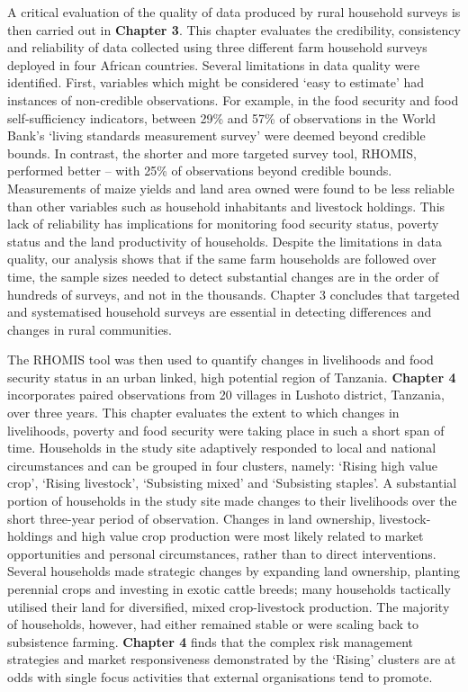 A critical evaluation of the quality of data produced by rural household surveys is then carried out in \textbf{Chapter 3}. This chapter evaluates the credibility, consistency and reliability of data collected using three different farm household surveys deployed in four African countries. Several limitations in data quality were identified. First, variables which might be considered `easy to estimate' had instances of non-credible observations. For example, in the food security and food self-sufficiency indicators, between 29\% and 57\% of observations in the World Bank's `living standards measurement survey' were deemed beyond credible bounds. In contrast, the shorter and more targeted survey tool, RHOMIS, performed better -- with 25\% of observations beyond credible bounds. Measurements of maize yields and land area owned were found to be less reliable than other variables such as household inhabitants and livestock holdings. This lack of reliability has implications for monitoring food security status, poverty status and the land productivity of households. Despite the limitations in data quality, our analysis shows that if the same farm households are followed over time, the sample sizes needed to detect substantial changes are in the order of hundreds of surveys, and not in the thousands. Chapter 3 concludes that targeted and systematised household surveys are essential in detecting differences and changes in rural communities.

The RHOMIS tool was then used to quantify changes in livelihoods and food security status in an urban linked, high potential region of Tanzania. \textbf{Chapter 4} incorporates paired observations from 20 villages in Lushoto district, Tanzania, over three years. This chapter evaluates the extent to which changes in livelihoods, poverty and food security were taking place in such a short span of time. Households in the study site adaptively responded to local and national circumstances and can be grouped in four clusters, namely: `Rising high value crop', `Rising livestock', `Subsisting mixed' and `Subsisting staples'. A substantial portion of households in the study site made changes to their livelihoods over the short three-year period of observation. Changes in land ownership, livestock-holdings and high value crop production were most likely related to market opportunities and personal circumstances, rather than to direct interventions. Several households made strategic changes by expanding land ownership, planting perennial crops and investing in exotic cattle breeds; many households tactically utilised their land for diversified, mixed crop-livestock production. The majority of households, however, had either remained stable or were scaling back to subsistence farming. \textbf{Chapter 4} finds that the complex risk management strategies and market responsiveness demonstrated by the `Rising' clusters are at odds with single focus activities that external organisations tend to promote.

